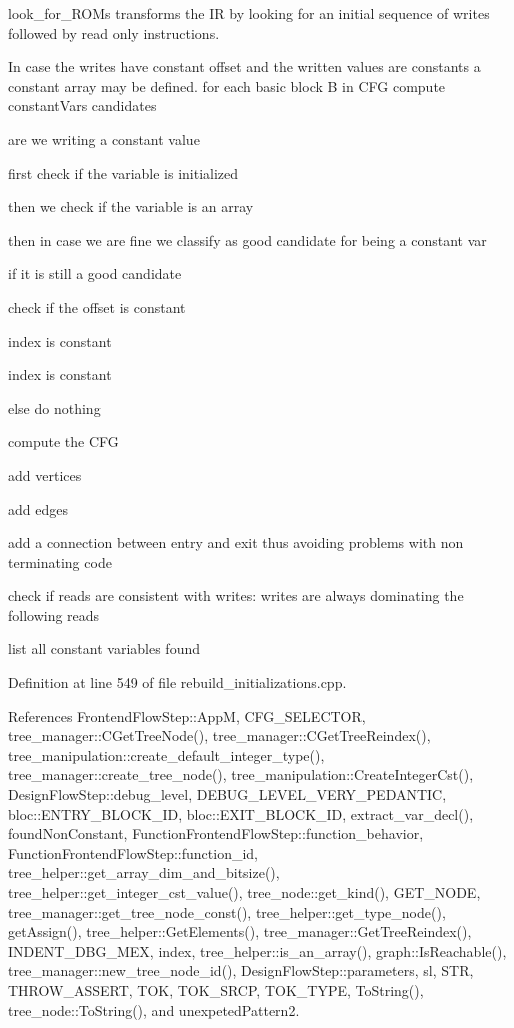 look\+\_\+for\+\_\+\+R\+O\+Ms transforms the IR by looking for an initial sequence of writes followed by read only instructions. 

In case the writes have constant offset and the written values are constants a constant array may be defined. for each basic block B in C\+FG compute constant\+Vars candidates

are we writing a constant value

first check if the variable is initialized

then we check if the variable is an array

then in case we are fine we classify as good candidate for being a constant var

if it is still a good candidate

check if the offset is constant

index is constant

index is constant

else do nothing

compute the C\+FG

add vertices

add edges

add a connection between entry and exit thus avoiding problems with non terminating code

check if reads are consistent with writes\+: writes are always dominating the following reads

list all constant variables found 

Definition at line 549 of file rebuild\+\_\+initializations.\+cpp.



References Frontend\+Flow\+Step\+::\+AppM, C\+F\+G\+\_\+\+S\+E\+L\+E\+C\+T\+OR, tree\+\_\+manager\+::\+C\+Get\+Tree\+Node(), tree\+\_\+manager\+::\+C\+Get\+Tree\+Reindex(), tree\+\_\+manipulation\+::create\+\_\+default\+\_\+integer\+\_\+type(), tree\+\_\+manager\+::create\+\_\+tree\+\_\+node(), tree\+\_\+manipulation\+::\+Create\+Integer\+Cst(), Design\+Flow\+Step\+::debug\+\_\+level, D\+E\+B\+U\+G\+\_\+\+L\+E\+V\+E\+L\+\_\+\+V\+E\+R\+Y\+\_\+\+P\+E\+D\+A\+N\+T\+IC, bloc\+::\+E\+N\+T\+R\+Y\+\_\+\+B\+L\+O\+C\+K\+\_\+\+ID, bloc\+::\+E\+X\+I\+T\+\_\+\+B\+L\+O\+C\+K\+\_\+\+ID, extract\+\_\+var\+\_\+decl(), found\+Non\+Constant, Function\+Frontend\+Flow\+Step\+::function\+\_\+behavior, Function\+Frontend\+Flow\+Step\+::function\+\_\+id, tree\+\_\+helper\+::get\+\_\+array\+\_\+dim\+\_\+and\+\_\+bitsize(), tree\+\_\+helper\+::get\+\_\+integer\+\_\+cst\+\_\+value(), tree\+\_\+node\+::get\+\_\+kind(), G\+E\+T\+\_\+\+N\+O\+DE, tree\+\_\+manager\+::get\+\_\+tree\+\_\+node\+\_\+const(), tree\+\_\+helper\+::get\+\_\+type\+\_\+node(), get\+Assign(), tree\+\_\+helper\+::\+Get\+Elements(), tree\+\_\+manager\+::\+Get\+Tree\+Reindex(), I\+N\+D\+E\+N\+T\+\_\+\+D\+B\+G\+\_\+\+M\+EX, index, tree\+\_\+helper\+::is\+\_\+an\+\_\+array(), graph\+::\+Is\+Reachable(), tree\+\_\+manager\+::new\+\_\+tree\+\_\+node\+\_\+id(), Design\+Flow\+Step\+::parameters, sl, S\+TR, T\+H\+R\+O\+W\+\_\+\+A\+S\+S\+E\+RT, T\+OK, T\+O\+K\+\_\+\+S\+R\+CP, T\+O\+K\+\_\+\+T\+Y\+PE, To\+String(), tree\+\_\+node\+::\+To\+String(), and unexpeted\+Pattern2.



